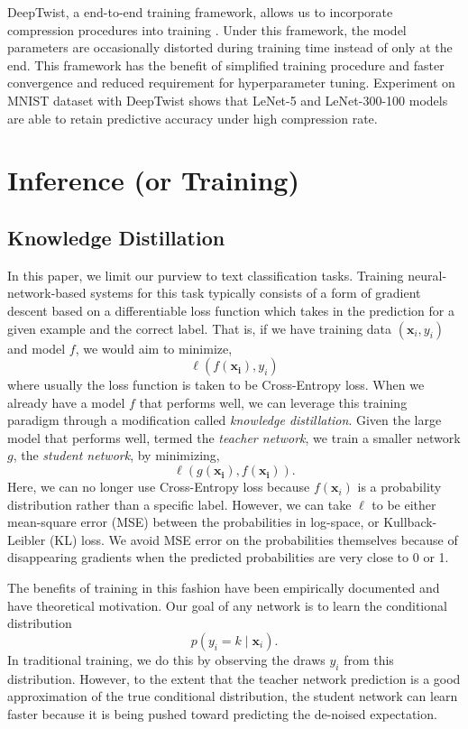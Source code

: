 \documentclass[10pt]{article}
\begin{document}
DeepTwist, a end-to-end training framework, allows us to incorporate
compression procedures into training \citep{lee2018deeptwist}. Under this
framework, the model parameters are occasionally distorted during training
time instead of only at the end. This framework has the benefit of simplified
training procedure and faster convergence and reduced requirement for
hyperparameter tuning. Experiment on MNIST dataset with DeepTwist shows that
LeNet-5 and LeNet-300-100 models are able to retain predictive accuracy under
high compression rate.


\section{Inference (or Training)}
\label{sec:training}


\subsection{Knowledge Distillation}
\label{subsec:kd}

In this paper, we limit our purview to text classification tasks. Training
neural-network-based systems for this task typically consists of a form of
gradient descent based on a differentiable loss function which takes in the
prediction for a given example and the correct label. That is, if we have
training data $(\bm{x}_i, y_i)$ and model $f$, we would aim to minimize,
\[ \ell(f(\bm{x_i}), y_i)\]
where usually the loss function is taken to be Cross-Entropy loss. When we
already have a model $f$ that performs well, we can leverage this training
paradigm through a modification called \emph{knowledge distillation}. Given
the large model that performs well, termed the \emph{teacher network}, we
train a smaller network $g$, the \emph{student network}, by minimizing,
\[ \ell(g(\bm{x_i}), f(\bm{x_i})).\]
Here, we can no longer use Cross-Entropy loss because $f(\bm{x}_i)$ is a
probability distribution rather than a specific label. However, we can take
$\ell$ to be either mean-square error (MSE) between the probabilities in
log-space, or Kullback-Leibler (KL) loss. We avoid MSE error on the
probabilities themselves because of disappearing gradients when the predicted
probabilities are very close to 0 or 1.

The benefits of training in this fashion have been empirically documented
\citep{hinton2015distilling} and have theoretical motivation. Our goal of any
network is to learn the conditional distribution 
\[ p(y_i = k \mid \bm{x}_i).\]
In traditional training, we do this by observing the draws $y_i$ from this
distribution. However, to the extent that the teacher network prediction is a
good approximation of the true conditional distribution, the student network
can learn faster because it is being pushed toward predicting the de-noised
expectation.
\end{document}
